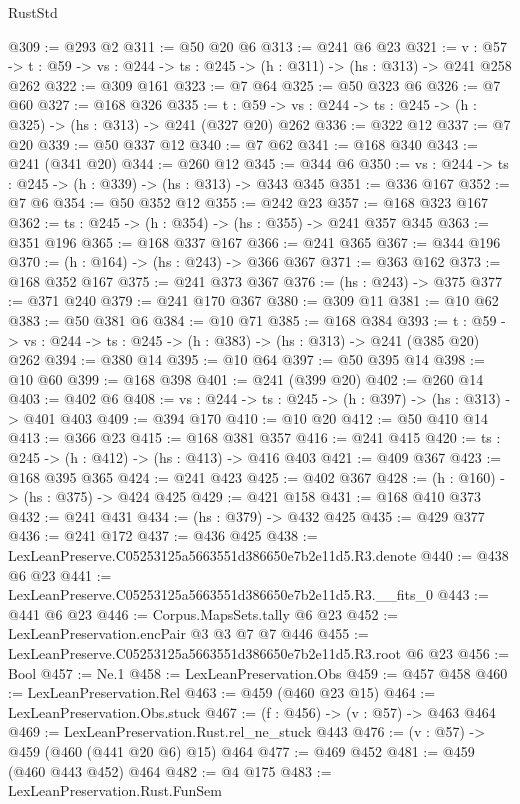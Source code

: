 \begin{lexlean}{RustStd}
\begin{coremodule}
@309 := @293 @2
@311 := @50 @20 @6
@313 := @241 @6 @23
@321 := {v : @57} ->
  {t : @59} -> {vs : @244} -> {ts : @245} -> (h : @311) -> (hs : @313) -> @241 @258 @262
@322 := @309 @161
@323 := @7 @64
@325 := @50 @323 @6
@326 := @7 @60
@327 := @168 @326
@335 := {t : @59} -> {vs : @244} -> {ts : @245} -> (h : @325) -> (hs : @313) -> @241 (@327 @20) @262
@336 := @322 @12
@337 := @7 @20
@339 := @50 @337 @12
@340 := @7 @62
@341 := @168 @340
@343 := @241 (@341 @20)
@344 := @260 @12
@345 := @344 @6
@350 := {vs : @244} -> {ts : @245} -> (h : @339) -> (hs : @313) -> @343 @345
@351 := @336 @167
@352 := @7 @6
@354 := @50 @352 @12
@355 := @242 @23
@357 := @168 @323 @167
@362 := {ts : @245} -> (h : @354) -> (hs : @355) -> @241 @357 @345
@363 := @351 @196
@365 := @168 @337 @167
@366 := @241 @365
@367 := @344 @196
@370 := (h : @164) -> (hs : @243) -> @366 @367
@371 := @363 @162
@373 := @168 @352 @167
@375 := @241 @373 @367
@376 := (hs : @243) -> @375
@377 := @371 @240
@379 := @241 @170 @367
@380 := @309 @11
@381 := @10 @62
@383 := @50 @381 @6
@384 := @10 @71
@385 := @168 @384
@393 := {t : @59} -> {vs : @244} -> {ts : @245} -> (h : @383) -> (hs : @313) -> @241 (@385 @20) @262
@394 := @380 @14
@395 := @10 @64
@397 := @50 @395 @14
@398 := @10 @60
@399 := @168 @398
@401 := @241 (@399 @20)
@402 := @260 @14
@403 := @402 @6
@408 := {vs : @244} -> {ts : @245} -> (h : @397) -> (hs : @313) -> @401 @403
@409 := @394 @170
@410 := @10 @20
@412 := @50 @410 @14
@413 := @366 @23
@415 := @168 @381 @357
@416 := @241 @415
@420 := {ts : @245} -> (h : @412) -> (hs : @413) -> @416 @403
@421 := @409 @367
@423 := @168 @395 @365
@424 := @241 @423
@425 := @402 @367
@428 := (h : @160) -> (hs : @375) -> @424 @425
@429 := @421 @158
@431 := @168 @410 @373
@432 := @241 @431
@434 := (hs : @379) -> @432 @425
@435 := @429 @377
@436 := @241 @172
@437 := @436 @425
@438 := LexLeanPreserve.C05253125a5663551d386650e7b2e11d5.R3.denote
@440 := @438 @6 @23
@441 := LexLeanPreserve.C05253125a5663551d386650e7b2e11d5.R3.__fits_0
@443 := @441 @6 @23
@446 := Corpus.MapsSets.tally @6 @23
@452 := LexLeanPreservation.encPair @3 @3 @7 @7 @446
@455 := LexLeanPreserve.C05253125a5663551d386650e7b2e11d5.R3.root @6 @23
@456 := Bool
@457 := Ne.{1}
@458 := LexLeanPreservation.Obs
@459 := @457 @458
@460 := LexLeanPreservation.Rel
@463 := @459 (@460 @23 @15)
@464 := LexLeanPreservation.Obs.stuck
@467 := (f : @456) -> (v : @57) -> @463 @464
@469 := LexLeanPreservation.Rust.rel_ne_stuck @443
@476 := (v : @57) -> @459 (@460 (@441 @20 @6) @15) @464
@477 := @469 @452
@481 := @459 (@460 @443 @452) @464
@482 := @4 @175
@483 := LexLeanPreservation.Rust.FunSem

\end{coremodule}
\end{lexlean}
